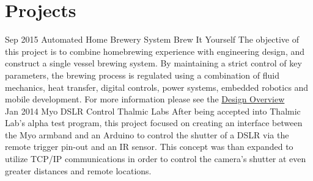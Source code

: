 \documentclass[print]{friggeri-cv} %
\begin{document}
\section{Projects}
\begin{entrylist}

\entry
{Sep 2015}
{}
{Automated Home Brewery System}
{Brew It Yourself}
{The objective of this project is to combine homebrewing experience with engineering design, and construct a single vessel brewing system. By maintaining a strict control of key parameters, the brewing process is regulated using a combination of fluid mechanics, heat transfer, digital controls, power systems, embedded robotics and mobile development.  For more information please see the \href{https://github.com/BrewItYourself/Documentation/blob/master/Final\%20Report/finalreportpdf/final-report.pdf}{Design Overview}}\\

\entry
{Jan 2014}
{}
{Myo DSLR Control}
{Thalmic Labs}
{After being accepted into Thalmic Lab's alpha test program, this project focused on creating an interface between the Myo armband and an Arduino to control the shutter of a DSLR via the remote trigger pin-out and an IR sensor.  This concept was than expanded to utilize TCP/IP communications in order to control the camera's shutter at even greater distances and remote locations.}
\end{entrylist}
%
%
%
\end{document}
